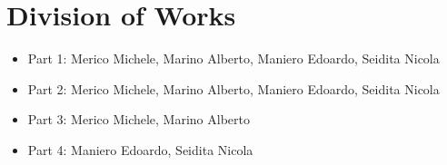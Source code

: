 \section{Division of Works}
\begin{itemize}
    \item Part 1: Merico Michele, Marino Alberto, Maniero Edoardo, Seidita Nicola
    \item Part 2: Merico Michele, Marino Alberto, Maniero Edoardo, Seidita Nicola
    \item Part 3: Merico Michele, Marino Alberto
    \item Part 4: Maniero Edoardo, Seidita Nicola
\end{itemize}